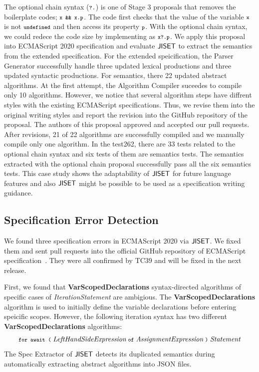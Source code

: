 The optional chain syntax (\( \texttt{\footnotesize?.} \)) is one of Stage 3 proposals that removes the
boilerplate codes; \( \texttt{\footnotesize x \&\& x.p} \). The code first checks that the value of
the variable \( \texttt{\footnotesize x} \) is not \( \texttt{\footnotesize undefined} \) and then access its
property \( \texttt{\footnotesize p} \). With the optional chain syntax, we could redece the code size
by implementing as \( \texttt{\footnotesize x?.p} \). We apply this proposal into ECMAScript 2020 specification
and evaluate \( \text{\sf JISET} \) to extract the semantics from the extended specification.
For the extended speicification, the \textsf{Parser Generator} successfully handle
three updated lexical productions and three updated syntactic productions.
For semantics, there 22 updated abstract algorithms. At the first attempt,
the \textsf{Algorithm Compiler} suceedes to compile only 10 algorithms.
However, we notice that several algorithm steps have diffrent styles with
the existing ECMAScript specifications. Thus, we revise them into the original
writing styles and report the revision into the GitHub repository of the proposal.
The authors of this proposal approved and accepted our pull requests.
After revisions, 21 of 22 algorithms are successfully compiled and we manually
compile only one algorithm. In the test262, there are 33 tests related to the optional chain
syntax and six tests of them are semantics tests. The semantics extracted with
the optional chain proposal successfully pass all the six semantics tests.
This case study shows the adaptability of \( \text{\sf JISET} \) for future language features
and also \( \text{\sf JISET} \) might be possible to be used as a specification writing guidance.

\subsection{Specification Error Detection}

We found three specification errors in ECMAScript 2020 via \( \text{\sf JISET} \).
We fixed them and sent pull requests into the official GitHub repository of
ECMAScript specification~\cite{es2020}. They were all confirmed by TC39
and will be fixed in the next release.

First, we found that \textbf{VarScopedDeclarations} syntax-directed algorithms of
specific cases of \textit{IterationStatement} are ambigious.
The \textbf{VarScopedDeclarations} algorithm is used to initially define
the variable declarations before entering speicific scopes.
However, the following iteration syntax has two different
\textbf{VarScopedDeclarations} algorithms:
\[
  \texttt{\footnotesize for await (} \; \textit{LeftHandSideExpression} \; \texttt{\footnotesize of} \;
\textit{AssignmentExpression} \; \texttt{\footnotesize)} \; \textit{Statement}
\]
The \textsf{Spec Extractor} of \( \text{\sf JISET} \) detects its duplicated
semantics during automatically extracting abstract algorithms into JSON files.

